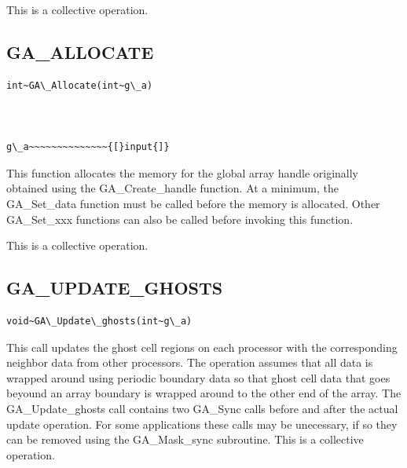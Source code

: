 This is a collective operation.


\subsection*{\label{sub:GA_ALLOCATE}GA\_ALLOCATE}
\begin{verbatim}
int~GA\_Allocate(int~g\_a)



g\_a~~~~~~~~~~~~~~{[}input{]}
\end{verbatim}
This function allocates the memory for the global array handle originally
obtained using the GA\_Create\_handle function. At a minimum, the
GA\_Set\_data function must be called before the memory is allocated.
Other GA\_Set\_xxx functions can also be called before invoking this
function.

This is a collective operation. 


\subsection*{\label{sub:GA_UPDATE_GHOSTS}GA\_UPDATE\_GHOSTS}
\begin{verbatim}
void~GA\_Update\_ghosts(int~g\_a)
\end{verbatim}
This call updates the ghost cell regions on each processor with the
corresponding neighbor data from other processors. The operation assumes
that all data is wrapped around using periodic boundary data so that
ghost cell data that goes beyound an array boundary is wrapped around
to the other end of the array. The GA\_Update\_ghosts call contains
two GA\_Sync calls before and after the actual update operation. For
some applications these calls may be unecessary, if so they can be
removed using the GA\_Mask\_sync subroutine. This is a collective
operation. 



